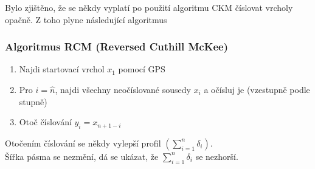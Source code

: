 \documentclass[../main.tex]{subfiles}
\begin{document}
\begin{remark}
    Bylo zjištěno, že se někdy vyplatí po použití algoritmu CKM číslovat vrcholy opačně. Z toho plyne následující algoritmus
\end{remark}

\subsubsection{Algoritmus RCM (Reversed Cuthill McKee)}

\begin{enumerate}
    \item Najdi startovací vrchol $x_1$ pomocí GPS
    \item Pro $i=\hat{n}$, najdi všechny neočíslované sousedy $x_i$ a očísluj je (vzestupně podle stupně)
    \item Otoč číslování $y_i = x_{n+1-i}$ 
\end{enumerate}

Otočením číslování se někdy vylepší profil $(\sum_{i=1}^{n} \delta_i)$.\\
Šířka pásma se nezmění, dá se ukázat, že $\sum_{i=1}^{n} \delta_i$ se nezhorší. 
\end{document}
